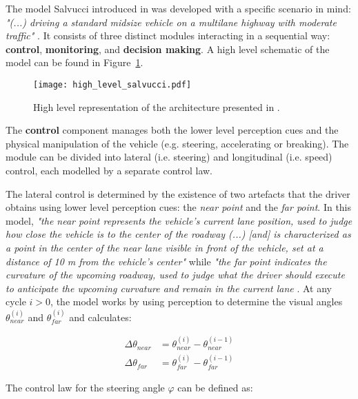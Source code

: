 The model Salvucci introduced in \cite{salvucci_1} was developed with a specific scenario in mind: \textit{"(...) driving a standard midsize vehicle on a multilane highway with moderate traffic"} \cite{salvucci_1}. It consists of three distinct modules interacting in a sequential way: \textbf{control}, \textbf{monitoring}, and \textbf{decision making}. A high level schematic of the model can be found in Figure~\ref{fig:high_level_salvucci}.

\begin{figure}[h]
    \centering
    \texttt{[image: high\_level\_salvucci.pdf]}
    \caption{High level representation of the architecture presented in \cite{salvucci_1}.}
    \label{fig:high_level_salvucci}
\end{figure}

The \textbf{control} component manages both the lower level perception cues and the physical manipulation of the vehicle (e.g. steering, accelerating or breaking). The module can be divided into lateral (i.e. steering) and longitudinal (i.e. speed) control, each modelled by a separate control law. 

The lateral control is determined by the existence of two artefacts that the driver obtains using lower level perception cues: the \textit{near point} and the \textit{far point}. In this model,  \textit{"the near point represents the vehicle’s current lane position, used to judge how close the vehicle is to the center of the roadway (...) [and] is characterized as a point in the center of the near lane visible in front of the vehicle, set at a distance of 10 m from the vehicle’s center"} while \textit{"the far point indicates the curvature of the upcoming roadway, used to judge what the driver should execute to anticipate the upcoming curvature and remain in the current lane} \cite{salvucci_1}. At any cycle $i > 0$, the model works by using perception to determine the visual angles $\theta_{near}^{(i)}$ and $\theta_{far}^{(i)}$ and calculates:

\begin{equation}
\begin{split}
	\Delta \theta_{near} & = \theta_{near}^{(i)} - \theta_{near}^{(i-1)} \\
	\Delta \theta_{far} & = \theta_{far}^{(i)} - \theta_{far}^{(i-1)}
\end{split}
\end{equation}

The control law for the steering angle $\varphi$ can be defined as:

